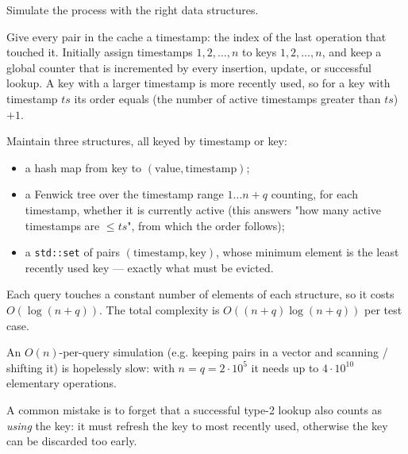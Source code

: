 Simulate the process with the right data structures.

Give every pair in the cache a timestamp: the index of the last operation that touched it. Initially assign timestamps $1, 2, \ldots, n$ to keys $1, 2, \ldots, n$, and keep a global counter that is incremented by every insertion, update, or successful lookup. A key with a larger timestamp is more recently used, so for a key with timestamp $ts$ its order equals (the number of active timestamps greater than $ts$) $+ 1$.

Maintain three structures, all keyed by timestamp or key:

\begin{itemize}
  \item a hash map from key to $(\text{value}, \text{timestamp})$;
  \item a Fenwick tree over the timestamp range $1 \ldots n+q$ counting, for each timestamp, whether it is currently active (this answers "how many active timestamps are $\le ts$", from which the order follows);
  \item a \texttt{std::set} of pairs $(\text{timestamp}, \text{key})$, whose minimum element is the least recently used key --- exactly what must be evicted.
\end{itemize}

Each query touches a constant number of elements of each structure, so it costs $O(\log(n+q))$. The total complexity is $O((n+q) \log (n+q))$ per test case.

An $O(n)$-per-query simulation (e.g. keeping pairs in a vector and scanning / shifting it) is hopelessly slow: with $n = q = 2 \cdot 10^5$ it needs up to $4 \cdot 10^{10}$ elementary operations.

A common mistake is to forget that a successful type-2 lookup also counts as \emph{using} the key: it must refresh the key to most recently used, otherwise the key can be discarded too early.
